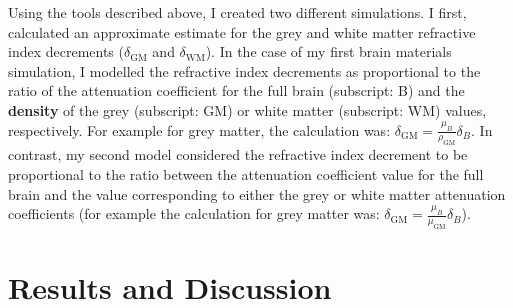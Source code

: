 \documentclass[10pt, a4paper, singlespacing]{report}
\begin{document}
Using the tools described above, I created two different simulations. I first, calculated an approximate estimate for the grey and white matter refractive index decrements ($\delta_{\mathrm{GM}}$ and $\delta_{\mathrm{WM}}$). In the case of my first brain materials simulation, I modelled the refractive index decrements as proportional to the ratio of the attenuation coefficient for the full brain (subscript: B) and the \textbf{density} of the grey (subscript: GM) or white matter (subscript: WM) values, respectively. For example for grey matter, the calculation was: $\delta_{\mathrm{GM}} = \frac{\mu_B}{\rho_{\mathrm{GM}}} \delta_B$. In contrast, my second model considered the refractive index decrement to be proportional to the ratio between the attenuation coefficient value for the full brain and the value corresponding to either the grey or white matter attenuation coefficients (for example the calculation for grey matter was: $\delta_{\mathrm{GM}} = \frac{\mu_B}{\mu_{\mathrm{GM}}} \delta_B$). 


\section{Results and Discussion}\label{Results}
\end{document}
